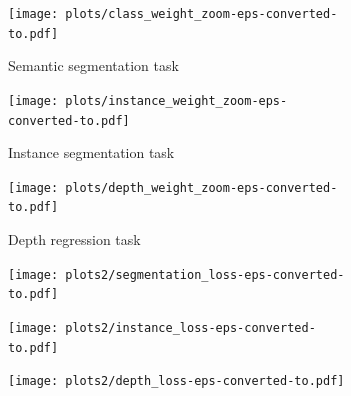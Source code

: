 \begin{figure}[p]
\begin{subfigure}[t]{0.32\linewidth}
\begin{center}
  \texttt{[image: plots/class\_weight\_zoom-eps-converted-to.pdf]}
  \caption{Semantic segmentation task}
\end{center}
\end{subfigure}
\begin{subfigure}[t]{0.32\linewidth}
\begin{center}
  \texttt{[image: plots/instance\_weight\_zoom-eps-converted-to.pdf]}
  \caption{Instance segmentation task}
\end{center}
\end{subfigure}
\begin{subfigure}[t]{0.32\linewidth}
\begin{center}
  \texttt{[image: plots/depth\_weight\_zoom-eps-converted-to.pdf]}
  \caption{Depth regression task}
\end{center}
\end{subfigure}
   \caption[Convergence of homoscedastic noise and task losses.]{\textbf{Training plots showing convergence of homoscedastic noise and task loss} for an array of initialisation choices for the homoscedastic uncertainty terms for all three tasks. Each plot shows the the homoscedastic noise value optimises to the same solution from a variety of initialisations. Despite the network taking $10,000+$ iterations for the training loss to converge, the task uncertainty converges very rapidly after only $~100$ iterations.}
\label{fig:convergence}

\begin{center}
\begin{subfigure}[t]{0.32\linewidth}
\begin{center}
  \texttt{[image: plots2/segmentation\_loss-eps-converted-to.pdf]}
\end{center}
\end{subfigure}
\begin{subfigure}[t]{0.32\linewidth}
\begin{center}
  \texttt{[image: plots2/instance\_loss-eps-converted-to.pdf]}
\end{center}
\end{subfigure}
\begin{subfigure}[t]{0.32\linewidth}
\begin{center}
  \texttt{[image: plots2/depth\_loss-eps-converted-to.pdf]}
\end{center}
\end{subfigure}



\end{center}
\end{figure}
